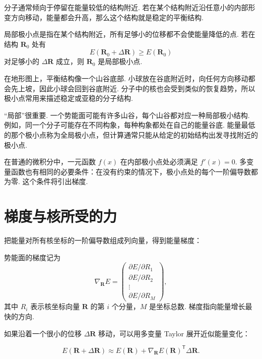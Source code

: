 \documentclass[UTF8,11pt,a4paper,openany]{ctexbook}
\begin{document}
分子通常倾向于停留在能量较低的结构附近. 若在某个结构附近沿任意小的内部形变方向移动，能量都会升高，那么这个结构就是稳定的平衡结构. 

\begin{definitionbox}
局部极小点是指在某个结构附近，所有足够小的位移都不会使能量降低的点. 若在结构 $\mathbf R_0$ 处有
\[
E(\mathbf R_0+\Delta\mathbf R)\geq E(\mathbf R_0)
\]
对足够小的 $\Delta\mathbf R$ 成立，则 $\mathbf R_0$ 是局部极小点. 
\end{definitionbox}

\begin{analogybox}
在地形图上，平衡结构像一个山谷底部. 小球放在谷底附近时，向任何方向移动都会先上坡，因此小球会回到谷底附近. 分子中的核也会受到类似的恢复趋势，所以极小点常用来描述稳定或亚稳的分子结构. 
\end{analogybox}

“局部”很重要. 一个势能面可能有许多山谷，每个山谷都对应一种局部极小结构. 例如，同一个分子可能存在不同构象，每种构象都处在自己的能量谷底. 能量最低的那个极小点称为全局极小点，但计算通常只能从给定的初始结构出发寻找附近的极小点. 

在普通的微积分中，一元函数 $f(x)$ 在内部极小点处必须满足 $f'(x)=0$. 多变量函数也有相同的必要条件：在没有约束的情况下，极小点处的每个一阶偏导数都为零. 这个条件将引出梯度. 

\section{梯度与核所受的力}

把能量对所有核坐标的一阶偏导数组成列向量，得到能量梯度：

\begin{notationbox}
势能面的梯度记为
\[
\nabla_{\mathbf R}E=
\begin{pmatrix}
\partial E/\partial R_1\\
\partial E/\partial R_2\\
\vdots\\
\partial E/\partial R_M
\end{pmatrix},
\]
其中 $R_i$ 表示核坐标向量 $\mathbf R$ 的第 $i$ 个分量，$M$ 是坐标总数. 梯度指向能量增长最快的方向. 
\end{notationbox}

如果沿着一个很小的位移 $\Delta\mathbf R$ 移动，可以用多变量 Taylor 展开近似能量变化：

\[
E(\mathbf R+\Delta\mathbf R)
\approx
E(\mathbf R)+
\nabla_{\mathbf R}E(\mathbf R)^{\mathsf T}\Delta\mathbf R.
\]
\end{document}
